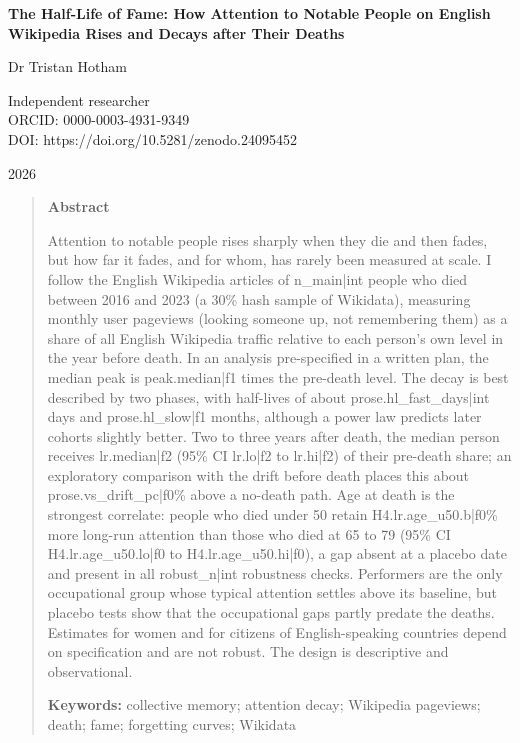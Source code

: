 \documentclass[11pt,a4paper]{article}
\begin{document}
\begin{center}
{\Large\bfseries The Half-Life of Fame: How Attention to Notable People on English Wikipedia Rises and Decays after Their Deaths\par}
\vspace{1.2em}
{\large Dr Tristan Hotham\par}
\vspace{0.3em}
{\small Independent researcher\\
ORCID: 0000-0003-4931-9349\\
DOI: https://doi.org/10.5281/zenodo.24095452\par}
\vspace{0.8em}
2026
\end{center}

\begin{quote}
\small
\begin{center}\textbf{Abstract}\end{center}
Attention to notable people rises sharply when they die and then fades, but how far it fades, and for whom, has rarely been measured at scale. I follow the English Wikipedia articles of {{n_main|int}} people who died between 2016 and 2023 (a 30\% hash sample of Wikidata), measuring monthly user pageviews (looking someone up, not remembering them) as a share of all English Wikipedia traffic relative to each person's own level in the year before death. In an analysis pre-specified in a written plan, the median peak is {{peak.median|f1}} times the pre-death level. The decay is best described by two phases, with half-lives of about {{prose.hl_fast_days|int}} days and {{prose.hl_slow|f1}} months, although a power law predicts later cohorts slightly better. Two to three years after death, the median person receives {{lr.median|f2}} (95\% CI {{lr.lo|f2}} to {{lr.hi|f2}}) of their pre-death share; an exploratory comparison with the drift before death places this about {{prose.vs_drift_pc|f0}}\% above a no-death path. Age at death is the strongest correlate: people who died under 50 retain {{H4.lr.age_u50.b|f0}}\% more long-run attention than those who died at 65 to 79 (95\% CI {{H4.lr.age_u50.lo|f0}} to {{H4.lr.age_u50.hi|f0}}), a gap absent at a placebo date and present in all {{robust_n|int}} robustness checks. Performers are the only occupational group whose typical attention settles above its baseline, but placebo tests show that the occupational gaps partly predate the deaths. Estimates for women and for citizens of English-speaking countries depend on specification and are not robust. The design is descriptive and observational.

\textbf{Keywords:} collective memory; attention decay; Wikipedia pageviews; death; fame; forgetting curves; Wikidata
\end{quote}
\end{document}
